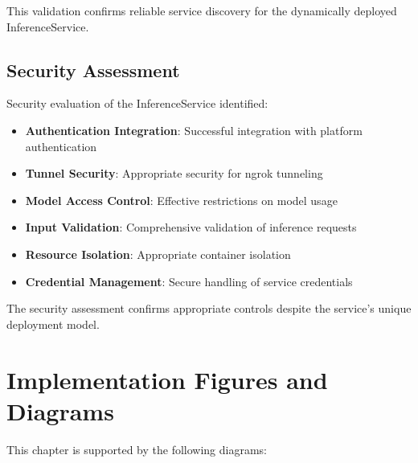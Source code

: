 This validation confirms reliable service discovery for the dynamically deployed InferenceService.

\subsection{Security Assessment}

Security evaluation of the InferenceService identified:

\begin{itemize}
    \item \textbf{Authentication Integration}: Successful integration with platform authentication
    \item \textbf{Tunnel Security}: Appropriate security for ngrok tunneling
    \item \textbf{Model Access Control}: Effective restrictions on model usage
    \item \textbf{Input Validation}: Comprehensive validation of inference requests
    \item \textbf{Resource Isolation}: Appropriate container isolation
    \item \textbf{Credential Management}: Secure handling of service credentials
\end{itemize}

The security assessment confirms appropriate controls despite the service's unique deployment model.

\section{Implementation Figures and Diagrams}

This chapter is supported by the following diagrams:



